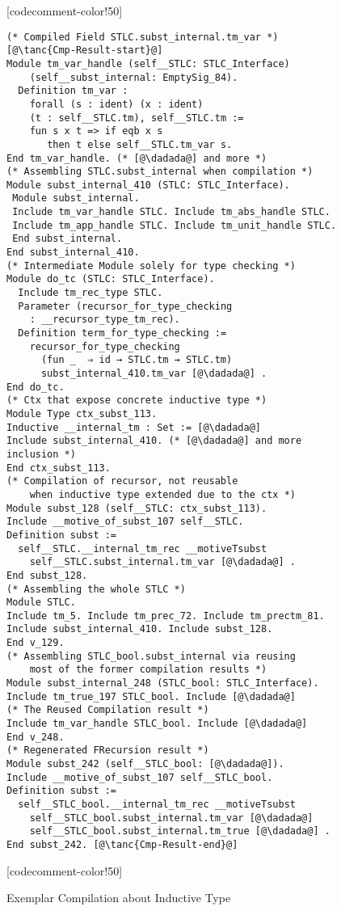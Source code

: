 \begin{figure}
\begin{minipage}{\textwidth}
\begin{multicols}{2}
[codecomment-color!50]


\columnbreak


\begin{lstlisting}
(* Compiled Field STLC.subst_internal.tm_var *) [@\tanc{Cmp-Result-start}@]
Module tm_var_handle (self__STLC: STLC_Interface)
    (self__subst_internal: EmptySig_84).
  Definition tm_var :
    forall (s : ident) (x : ident) 
    (t : self__STLC.tm), self__STLC.tm :=
    fun s x t => if eqb x s
       then t else self__STLC.tm_var s.
End tm_var_handle. (* [@\dadada@] and more *)
(* Assembling STLC.subst_internal when compilation *)
Module subst_internal_410 (STLC: STLC_Interface). 
 Module subst_internal.
 Include tm_var_handle STLC. Include tm_abs_handle STLC.
 Include tm_app_handle STLC. Include tm_unit_handle STLC.
 End subst_internal.
End subst_internal_410.
(* Intermediate Module solely for type checking *)
Module do_tc (STLC: STLC_Interface).
  Include tm_rec_type STLC.
  Parameter (recursor_for_type_checking 
    : __recursor_type_tm_rec).
  Definition term_for_type_checking :=
    recursor_for_type_checking 
      (fun _  ⇒ id → STLC.tm → STLC.tm)
      subst_internal_410.tm_var [@\dadada@] .
End do_tc.
(* Ctx that expose concrete inductive type *)
Module Type ctx_subst_113.
Inductive __internal_tm : Set := [@\dadada@] 
Include subst_internal_410. (* [@\dadada@] and more inclusion *)
End ctx_subst_113.
(* Compilation of recursor, not reusable
    when inductive type extended due to the ctx *)
Module subst_128 (self__STLC: ctx_subst_113).
Include __motive_of_subst_107 self__STLC.
Definition subst :=
  self__STLC.__internal_tm_rec __motiveTsubst
	self__STLC.subst_internal.tm_var [@\dadada@] .
End subst_128.
(* Assembling the whole STLC *)
Module STLC.
Include tm_5. Include tm_prec_72. Include tm_prectm_81.
Include subst_internal_410. Include subst_128.
End v_129.
(* Assembling STLC_bool.subst_internal via reusing 
    most of the former compilation results *)
Module subst_internal_248 (STLC_bool: STLC_Interface).
Include tm_true_197 STLC_bool. Include [@\dadada@]
(* The Reused Compilation result *)
Include tm_var_handle STLC_bool. Include [@\dadada@]
End v_248. 
(* Regenerated FRecursion result *)
Module subst_242 (self__STLC_bool: [@\dadada@]).
Include __motive_of_subst_107 self__STLC_bool.
Definition subst :=
  self__STLC_bool.__internal_tm_rec __motiveTsubst
	self__STLC_bool.subst_internal.tm_var [@\dadada@]
    self__STLC_bool.subst_internal.tm_true [@\dadada@] .
End subst_242. [@\tanc{Cmp-Result-end}@]
\end{lstlisting}

[codecomment-color!50]


\end{multicols}
\end{minipage}

\caption{Exemplar Compilation about Inductive Type}\label{fig:plugin-example2}
\end{figure}